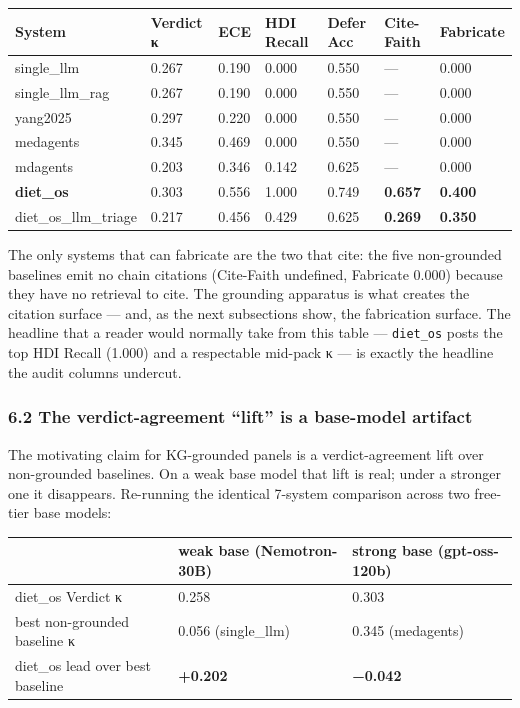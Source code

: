 \documentclass[
]{article}
\begin{document}
\begin{longtable}[]{@{}lllllll@{}}
\toprule
System & Verdict κ & ECE & HDI Recall & Defer Acc & Cite-Faith &
Fabricate\tabularnewline
\midrule
\endhead
single\_llm & 0.267 & 0.190 & 0.000 & 0.550 & --- & 0.000\tabularnewline
single\_llm\_rag & 0.267 & 0.190 & 0.000 & 0.550 & --- &
0.000\tabularnewline
yang2025 & 0.297 & 0.220 & 0.000 & 0.550 & --- & 0.000\tabularnewline
medagents & 0.345 & 0.469 & 0.000 & 0.550 & --- & 0.000\tabularnewline
mdagents & 0.203 & 0.346 & 0.142 & 0.625 & --- & 0.000\tabularnewline
\textbf{diet\_os} & 0.303 & 0.556 & 1.000 & 0.749 & \textbf{0.657} &
\textbf{0.400}\tabularnewline
diet\_os\_llm\_triage & 0.217 & 0.456 & 0.429 & 0.625 & \textbf{0.269} &
\textbf{0.350}\tabularnewline
\bottomrule
\end{longtable}

The only systems that can fabricate are the two that cite: the five
non-grounded baselines emit no chain citations (Cite-Faith undefined,
Fabricate 0.000) because they have no retrieval to cite. The grounding
apparatus is what creates the citation surface --- and, as the next
subsections show, the fabrication surface. The headline that a reader
would normally take from this table --- \texttt{diet\_os} posts the top
HDI Recall (1.000) and a respectable mid-pack κ --- is exactly the
headline the audit columns undercut.

\hypertarget{the-verdict-agreement-lift-is-a-base-model-artifact}{%
\subsubsection{6.2 The verdict-agreement ``lift'' is a base-model
artifact}\label{the-verdict-agreement-lift-is-a-base-model-artifact}}

The motivating claim for KG-grounded panels is a verdict-agreement lift
over non-grounded baselines. On a weak base model that lift is real;
under a stronger one it disappears. Re-running the identical 7-system
comparison across two free-tier base models:

\begin{longtable}[]{@{}lll@{}}
\toprule
& weak base (Nemotron-30B) & strong base (gpt-oss-120b)\tabularnewline
\midrule
\endhead
diet\_os Verdict κ & 0.258 & 0.303\tabularnewline
best non-grounded baseline κ & 0.056 (single\_llm) & 0.345
(medagents)\tabularnewline
diet\_os lead over best baseline & \textbf{+0.202} &
\textbf{−0.042}\tabularnewline
\bottomrule
\end{longtable}
\end{document}
